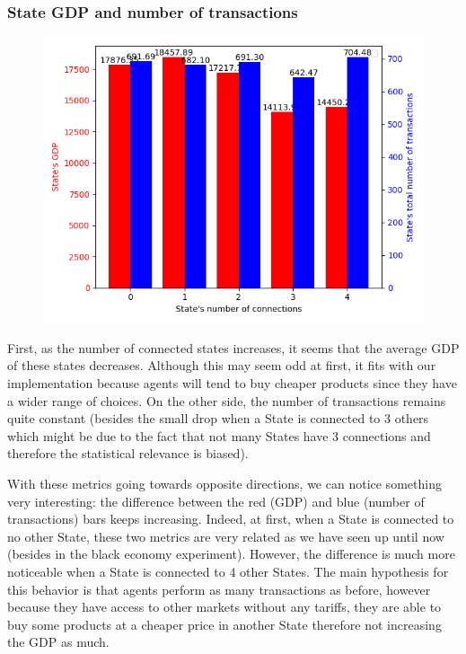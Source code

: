 {{{{{{{{        \subsubsection{State GDP and number of transactions}

        \begin{figure}
            \includegraphics[width=\linewidth]{img/exp/9_1.png}
        \end{figure} 
        { First, as the number of connected states increases, it seems that the average GDP of these states decreases. Although this may seem odd at first, it fits with our implementation because agents will tend to buy cheaper products since they have a wider range of choices. On the other side, the number of transactions remains quite constant (besides the small drop when a State is connected to 3 others which might be due to the fact that not many States have 3 connections and therefore the statistical relevance is biased).

        With these metrics going towards opposite directions, we can notice something very interesting: the difference between the red (GDP) and blue (number of transactions) bars keeps increasing. Indeed, at first, when a State is connected to no other State, these two metrics are very related as we have seen up until now (besides in the black economy experiment). However, the difference is much more noticeable when a State is connected to 4 other States. The main hypothesis for this behavior is that agents perform as many transactions as before, however because they have access to other markets without any tariffs, they are able to buy some products at a cheaper price in another State therefore not increasing the GDP as much.

}}}}}}}}}
